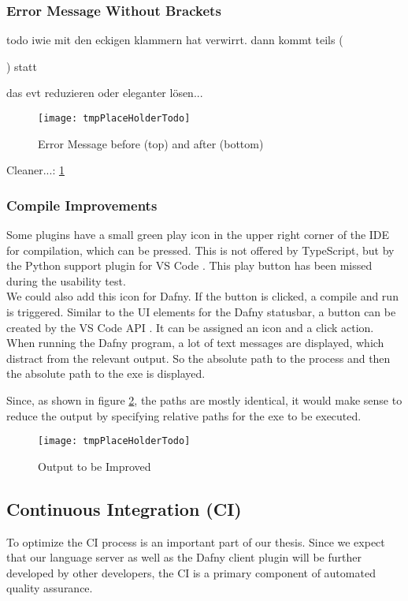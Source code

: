 \subsubsection{Error Message Without Brackets}
todo iwie mit den eckigen klammern hat verwirrt. dann kommt teils ({) statt {
das evt reduzieren oder eleganter lösen...

\begin{figure}[H]
    \centering
    \texttt{[image: tmpPlaceHolderTodo]}
    \caption{Error Message before (top) and after (bottom)}
    \label{fig:cleaner_error_msg}
\end{figure}

Cleaner...:
\ref{fig:cleaner_error_msg}

\subsubsection{Compile Improvements}
Some plugins have a small green play icon in the upper right corner of the IDE for compilation,
which can be pressed. This is not offered by TypeScript, but by the Python support plugin for VS Code \cite{interview-remo}.
This play button has been missed during the usability test. \\

We could also add this icon for Dafny. If the button is clicked, a compile and run is triggered.
Similar to the UI elements for the Dafny statusbar,
a button can be created by the VS Code API \cite{vscodeAPI}.
It can be assigned an icon and a click action. \\

When running the Dafny program,
a lot of text messages are displayed,
which distract from the relevant output.
So the absolute path to the process and then the absolute path to the exe is displayed.

 Since, as shown in figure \ref{fig:long_compile_output}, the paths are mostly identical,
 it would make sense to reduce the output by specifying relative paths for the exe to be executed.

\begin{figure}[H]
    \centering
    \texttt{[image: tmpPlaceHolderTodo]}
    \caption{Output to be Improved}
    \label{fig:long_compile_output}
\end{figure}

\subsection{Continuous Integration (CI)}
To optimize the CI process is an important part of our thesis.
Since we expect that our language server as well as the Dafny client plugin will be further developed by other developers,
the CI is a primary component of automated quality assurance. \\

}}
